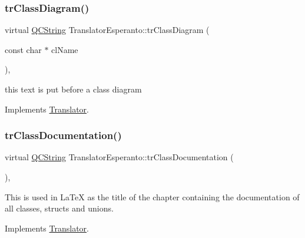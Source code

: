 \mbox{\label{class_translator_esperanto_afbdf41c7ba02567a3aa47a0f94f730e8}} 
\subsubsection{\texorpdfstring{trClassDiagram()}{trClassDiagram()}}
{\footnotesize\ttfamily virtual \mbox{\hyperlink{class_q_c_string}{Q\+C\+String}} Translator\+Esperanto\+::tr\+Class\+Diagram (\begin{DoxyParamCaption}\item[{const char $\ast$}]{cl\+Name }\end{DoxyParamCaption})\hspace{0.3cm}{\ttfamily [inline]}, {\ttfamily [virtual]}}

this text is put before a class diagram 

Implements \mbox{\hyperlink{class_translator}{Translator}}.

\mbox{\label{class_translator_esperanto_afdcc46ecc7822a943d4bf94537902c07}} 
\subsubsection{\texorpdfstring{trClassDocumentation()}{trClassDocumentation()}}
{\footnotesize\ttfamily virtual \mbox{\hyperlink{class_q_c_string}{Q\+C\+String}} Translator\+Esperanto\+::tr\+Class\+Documentation (\begin{DoxyParamCaption}{ }\end{DoxyParamCaption})\hspace{0.3cm}{\ttfamily [inline]}, {\ttfamily [virtual]}}

This is used in La\+TeX as the title of the chapter containing the documentation of all classes, structs and unions. 

Implements \mbox{\hyperlink{class_translator}{Translator}}.

\mbox{\label{class_translator_esperanto_a8dd3e76e6aa882bd0045da4976a321c1}} 

